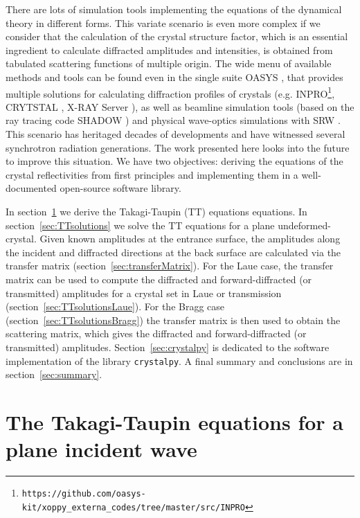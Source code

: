 \documentclass[preprint]{iucr}              %
\begin{document}
There are lots of simulation tools implementing the equations of the dynamical theory in different forms. This variate scenario is even more complex if we consider that the calculation of the crystal structure factor, which is an essential ingredient to calculate diffracted amplitudes and intensities, is obtained from tabulated scattering functions of multiple origin. The wide menu of available methods and tools can be found even in the single suite OASYS \cite{codeOASYS}, that provides multiple solutions for calculating diffraction profiles of crystals (e.g. INPRO\footnote{\texttt{https://github.com/oasys-kit/xoppy\_externa\_codes/tree/master/src/INPRO}}, CRYTSTAL \cite{codeCRYSTAL}, X-RAY Server \cite{codeXRAYserver}), as well as beamline simulation tools (based on the ray tracing code SHADOW \cite{codeSHADOW}) and physical wave-optics simulations with SRW \cite{codeSRW, codeSRWcrystals}. This scenario has heritaged decades of developments and have witnessed several synchrotron radiation generations. The work presented here looks into the future to improve this situation. We have two objectives: deriving the equations of the crystal reflectivities from first principles and implementing them in a well-documented open-source software library.

In section~\ref{sec:TT} we derive the Takagi-Taupin (TT) equations \cite{Takagi1962, Taupin, Taupin1967} equations.
In section~\ref{sec:TTsolutions} we solve the TT equations for a plane undeformed-crystal.
Given known amplitudes at the entrance surface,
the amplitudes along the incident and diffracted directions at the back surface are calculated via the transfer matrix (section~\ref{sec:transferMatrix}). For the Laue case, the transfer matrix can be used to compute the diffracted and forward-diffracted (or transmitted) amplitudes for a crystal set in Laue or transmission (section~\ref{sec:TTsolutionsLaue}). For the Bragg case (section~\ref{sec:TTsolutionsBragg}) the transfer matrix is then used to obtain the scattering matrix, which gives the diffracted and forward-diffracted (or transmitted) amplitudes. 
Section~\ref{sec:crystalpy} is dedicated to the software implementation of the library \texttt{crystalpy}. A final summary and conclusions are in section~\ref{sec:summary}.
 
%
\section{The Takagi-Taupin equations for a plane incident wave}
\label{sec:TT}
\end{document}

